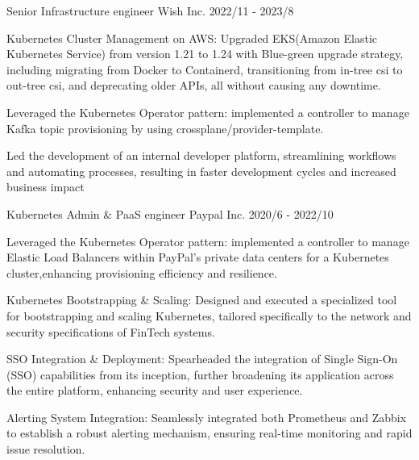 

\begin{cventries}

\cventry
  {Senior Infrastructure engineer} %
  {Wish Inc.} %
  {} %
  {2022/11 - 2023/8} %
  {
    \begin{cvitems} %
      \item {Kubernetes Cluster Management on AWS: Upgraded EKS(Amazon Elastic Kubernetes Service) from version 1.21 to 1.24 with Blue-green upgrade strategy, including migrating from Docker to Containerd, transitioning from in-tree csi to out-tree csi, and deprecating older APIs, all without causing any downtime.}
      \item {Leveraged the Kubernetes Operator pattern: implemented a controller to manage Kafka topic provisioning by using crossplane/provider-template.}
      \item {Led the development of an internal developer platform, streamlining workflows and automating processes, resulting in faster development cycles and increased business impact}
    \end{cvitems}
  }

  
  \cventry
    {Kubernetes Admin \& PaaS engineer} %
    {Paypal Inc.} %
    {} %
    {2020/6 - 2022/10} %
    {
      \begin{cvitems} %
        \item {Leveraged the Kubernetes Operator pattern: implemented a controller to manage Elastic Load Balancers within PayPal's private data centers for a Kubernetes cluster,enhancing provisioning efficiency and resilience. }
        \item {Kubernetes Bootstrapping \& Scaling: Designed and executed a specialized tool for bootstrapping and scaling Kubernetes, tailored specifically to the network and security specifications of FinTech systems. }
        \item { SSO Integration \& Deployment: Spearheaded the integration of Single Sign-On (SSO) capabilities from its inception, further broadening its application across the entire platform, enhancing security and user experience. }
        \item {Alerting System Integration: Seamlessly integrated both Prometheus and Zabbix to establish a robust alerting mechanism, ensuring real-time monitoring and rapid issue resolution. }
      \end{cvitems}
    }



\end{cventries}
